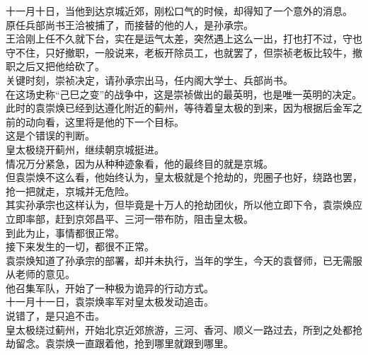 \begin{multicols}{\theparacolNo}
十一月十日，当他到达京城近郊，刚松口气的时候，却得知了一个意外的消息。\\

原任兵部尚书王洽被捕了，而接替的他的人，是孙承宗。\\

王洽刚上任不久就下台，实在是运气太差，突然遇上这么一出，打也打不过，守也守不住，只好撤职，一般说来，老板开除员工，也就罢了，但崇祯老板比较牛，撤职之后又把他给砍了。\\

关键时刻，崇祯决定，请孙承宗出马，任内阁大学士、兵部尚书。\\

在这场史称“己巳之变”的战争中，这是崇祯做出的最英明，也是唯一英明的决定。\\

此时的袁崇焕已经到达遵化附近的蓟州，等待着皇太极的到来，因为根据后金军之前的动向看，这里将是他的下一个目标。\\

这是个错误的判断。\\

皇太极绕开蓟州，继续朝京城挺进。\\

情况万分紧急，因为从种种迹象看，他的最终目的就是京城。\\

但袁崇焕不这么看，他始终认为，皇太极就是个抢劫的，兜圈子也好，绕路也罢，抢一把就走，京城并无危险。\\

其实孙承宗也这样认为，但毕竟是十万人的抢劫团伙，所以他立即下令，袁崇焕应立即率部，赶到京郊昌平、三河一带布防，阻击皇太极。\\

到此为止，事情都很正常。\\

接下来发生的一切，都很不正常。\\

袁崇焕知道了孙承宗的部署，却并未执行，当年的学生，今天的袁督师，已无需服从老师的意见。\\

他召集军队，开始了一种极为诡异的行动方式。\\

十一月十一日，袁崇焕率军对皇太极发动追击。\\

说错了，是只追不击。\\

皇太极绕过蓟州，开始北京近郊旅游，三河、香河、顺义一路过去，所到之处都抢劫留念。袁崇焕一直跟着他，抢到哪里就跟到哪里。\\


\end{multicols}
